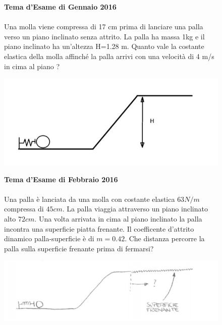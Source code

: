 
\begin{figure}[h!]
\textbf{Tema d'Esame di Gennaio 2016}\\ \\
Una molla viene compressa di 17 cm prima di lanciare una palla verso un piano inclinato
senza attrito. La palla ha massa 1kg e il piano inclinato ha un'altezza H=1.28 m. Quanto vale
la costante elastica della molla affinché la palla arrivi con una velocità di 4 m/s in cima al
piano ?
\\
	\begin{center}
		\includegraphics[scale=0.5]{ES2/GEN022016.jpg}
	\end{center}
\end{figure}

\begin{figure}[h!]
\textbf{Tema d'Esame di Febbraio 2016}\\ \\
Una palla è lanciata da una molla con costante elastica $63 N/m$ compressa di $45 cm$. La palla viaggia attraverso un piano inclinato alto $72 cm$. Una volta arrivata in cima al piano inclinato la palla incontra una superficie piatta frenante. Il coefficente d'attrito dinamico palla-superficie è di $m=0.42$. Che distanza percorre la palla sulla superficie frenante prima di fermarsi?
\\
	\begin{center}
		\includegraphics[scale=0.5]{ES2/FEB022016.jpg}
	\end{center}
\end{figure}

